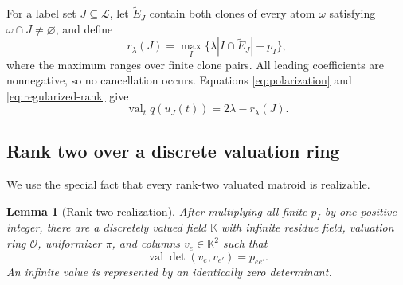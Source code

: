 \documentclass[11pt]{article}
\newtheorem{lemma}[theorem]{Lemma}
\theoremstyle{remark}
\newcommand{\K}{\mathbb{K}}
\newcommand{\OO}{\mathcal{O}}
\newcommand{\val}{\operatorname{val}}
\begin{document}
For a label set $J\subseteq\mathcal L$, let $\widetilde E_J$ contain both
clones of every atom $\omega$ satisfying $\omega\cap J\neq\varnothing$, and
define
\begin{equation}
 r_\lambda(J)=
 \max_{I}\{\lambda|I\cap\widetilde E_J|-p_I\},
 \label{eq:regularized-rank}
\end{equation}
where the maximum ranges over finite clone pairs.  All leading coefficients
are nonnegative, so no cancellation occurs.  Equations
\eqref{eq:polarization} and \eqref{eq:regularized-rank} give
\begin{equation}
 \val_t q(u_J(t))=2\lambda-r_\lambda(J).
 \label{eq:evaluation-valuation}
\end{equation}

\subsection{Rank two over a discrete valuation ring}

We use the special fact that every rank-two valuated matroid is realizable.

\begin{lemma}[Rank-two realization]
\label{lem:realization}
After multiplying all finite $p_I$ by one positive integer, there are a
discretely valued field $\K$ with infinite residue field, valuation ring
$\OO$, uniformizer $\pi$, and columns $v_e\in\K^2$ such that
\[
 \val\det(v_e,v_{e'})=p_{ee'}.
\]
An infinite value is represented by an identically zero determinant.
\end{lemma}
\end{document}
